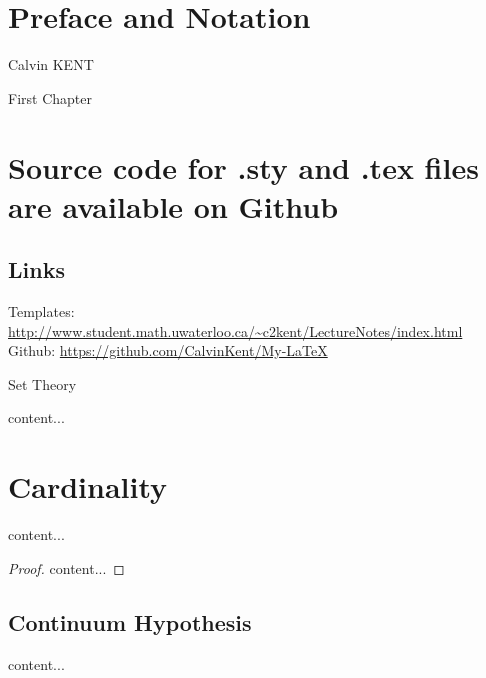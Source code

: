 \documentclass[11pt,oneside]{book} %
\begin{document}
	\renewcommand*{\headtitle}{MATH xxx Midterm yy Practice} %
	\renewcommand*{\term}{Term 2000} %
	\renewcommand*{\coursecode}{MATH 000} %
	\renewcommand*{\coursename}{Course Name} %
	\renewcommand*{\profname}{ProfFName ProfLName} %
	\renewcommand*{\cnlink}{http://www.student.math.uwaterloo.ca/~c2kent/} %
	\setfigpath
	\inserttoctitle
	\pagestyle{plain}
	\section*{Preface and Notation}
	\fppreface
	\hfill Calvin KENT
	\clearpage
	\pagestyle{examprac}
	\renewcommand{\chaptermark}[1]{ \markboth{#1}{} }
	\renewcommand{\sectionmark}[1]{ \markright{#1}{} }
\begin{pracchap}[1]{First Chapter}
	\section{Source code for .sty and .tex files are available on Github}
	\subsection{Links}
	Templates: \url{http://www.student.math.uwaterloo.ca/~c2kent/LectureNotes/index.html}\\
	Github: \url{https://github.com/CalvinKent/My-LaTeX}
\end{pracchap}
\begin{pracchap}[-1]{Set Theory}
	\begin{rem}
		content...
	\end{rem}
	\section{Cardinality}
	\begin{thrm}
		content...
	\end{thrm}
	\begin{proof}
		content...
	\end{proof}
	\subsection{Continuum Hypothesis}
	\begin{qsm}
		content...
	\end{qsm}
\end{pracchap}
\end{document}
